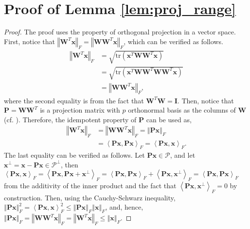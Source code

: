 \documentclass[USenglish,oneside,twocolumn]{article}
\theoremstyle{definition}
\theoremstyle{remark}
\theoremstyle{plain}
\theoremstyle{plain}
\begin{document}
{



\appendix


\section{Proof of Lemma \ref{lem:proj_range}}
\label{sec:proof_lem_proj_range}

\begin{proof}
The proof uses the property of orthogonal projection in a vector space.
First, notice that $\left\Vert \mathbf{W}^{T}\mathbf{x}\right\Vert _{F}=\left\Vert \mathbf{W}\mathbf{W}^{T}\mathbf{x}\right\Vert _{F}$,
which can be verified as follows.
\begin{align*}
\left\Vert \mathbf{W}^{T}\mathbf{x}\right\Vert _{F} & =\sqrt{\mathrm{tr}(\mathbf{x}^{T}\mathbf{W}\mathbf{W}^{T}\mathbf{x})}\\
 & =\sqrt{\mathrm{tr}(\mathbf{x}^{T}\mathbf{W}\mathbf{W}^{T}\mathbf{W}\mathbf{W}^{T}\mathbf{x})}\\
 & =\left\Vert \mathbf{W}\mathbf{W}^{T}\mathbf{x}\right\Vert _{F},
\end{align*}
where the second equality is from the fact that $\mathbf{W}^{T}\mathbf{W}=\mathbf{I}$.
Then, notice that $\mathbf{P}=\mathbf{W}\mathbf{W}^{T}$ is a projection
matrix with $p$ orthonormal basis as the columns of $\mathbf{W}$
(cf. \cite[Chapter 5]{RefWorks:290}). Therefore, the idempotent property
of $\mathbf{P}$ can be used as,
\begin{align*}
\left\Vert \mathbf{W}^{T}\mathbf{x}\right\Vert _{F} & =\left\Vert \mathbf{W}\mathbf{W}^{T}\mathbf{x}\right\Vert _{F}=\left\Vert \mathbf{P}\mathbf{x}\right\Vert _{F}\\
 & =\left\langle \mathbf{P}\mathbf{x},\mathbf{P}\mathbf{x}\right\rangle _{F}=\left\langle \mathbf{P}\mathbf{x},\mathbf{x}\right\rangle _{F}.
\end{align*}
The last equality can be verified as follows. Let $\mathbf{P}\mathbf{x}\in\mathcal{P}$,
and let $\mathbf{x}^{\bot}=\mathbf{x}-\mathbf{P}\mathbf{x}\in\mathcal{P}^{\bot}$,
then $\left\langle \mathbf{P}\mathbf{x},\mathbf{x}\right\rangle _{F}=\left\langle \mathbf{P}\mathbf{x},\mathbf{P}\mathbf{x}+\mathbf{x}^{\bot}\right\rangle _{F}=\left\langle \mathbf{P}\mathbf{x},\mathbf{P}\mathbf{x}\right\rangle _{F}+\left\langle \mathbf{P}\mathbf{x},\mathbf{x}^{\bot}\right\rangle _{F}=\left\langle \mathbf{P}\mathbf{x},\mathbf{P}\mathbf{x}\right\rangle _{F}$
from the additivity of the inner product and the fact that $\left\langle \mathbf{P}\mathbf{x},\mathbf{x}^{\bot}\right\rangle _{F}=0$
by construction. Then, using the Cauchy-Schwarz inequality, $\left\Vert \mathbf{P}\mathbf{x}\right\Vert _{F}^{2}=\left\langle \mathbf{P}\mathbf{x},\mathbf{x}\right\rangle _{F}^{2}\leq\left\Vert \mathbf{P}\mathbf{x}\right\Vert _{F}\left\Vert \mathbf{x}\right\Vert _{F}$,
and, hence, $\left\Vert \mathbf{P}\mathbf{x}\right\Vert _{F}=\left\Vert \mathbf{W}\mathbf{W}^{T}\mathbf{x}\right\Vert _{F}=\left\Vert \mathbf{W}^{T}\mathbf{x}\right\Vert _{F}\leq\left\Vert \mathbf{x}\right\Vert _{F}$.
\end{proof}


}
\end{document}
